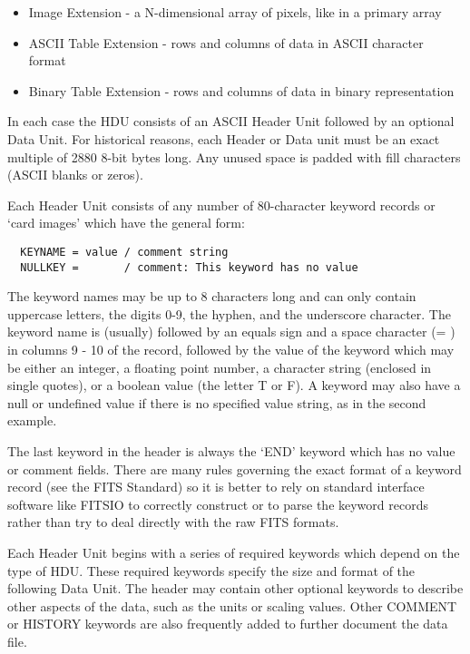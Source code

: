 \documentclass[11pt]{book}
\begin{document}
\begin{itemize}
\item
  Image Extension - a N-dimensional array of pixels, like in a primary array
\item
  ASCII Table Extension - rows and columns of data in ASCII character format
\item
  Binary Table Extension - rows and columns of data in binary representation
\end{itemize}

In each case the HDU consists of an ASCII Header Unit followed by an optional
Data Unit.  For historical reasons, each Header or Data unit must be an
exact multiple of 2880 8-bit bytes long.  Any unused space is padded
with fill characters (ASCII blanks or zeros).

Each Header Unit consists of any number of 80-character keyword records
or `card images' which have the general form:

\begin{verbatim}
  KEYNAME = value / comment string
  NULLKEY =       / comment: This keyword has no value
\end{verbatim}
The keyword names may be up to 8 characters long and can only contain
uppercase letters, the digits 0-9, the hyphen, and the underscore
character. The keyword name is (usually) followed by an equals sign and
a space character (= ) in columns 9 - 10 of the record, followed by the
value of the keyword which may be either an integer, a floating point
number, a character string (enclosed in single quotes), or a boolean
value (the letter T or F).   A keyword may also have a null or undefined
value if there is no specified value string, as in the second example.

The last keyword in the header is always the `END' keyword which has no
value or comment fields. There are many rules governing the exact
format of a keyword record (see the FITS Standard) so it is better
to rely on standard interface software like FITSIO to correctly
construct or to parse the keyword records rather than try to deal
directly with the raw FITS formats.

Each Header Unit begins with a series of required keywords which depend
on the type of HDU.  These required keywords specify the size and
format of the following Data Unit.  The header may contain other
optional keywords to describe other aspects of the data, such as the
units or scaling values.  Other COMMENT or HISTORY keywords are also
frequently added to further document the data file.
\end{document}
